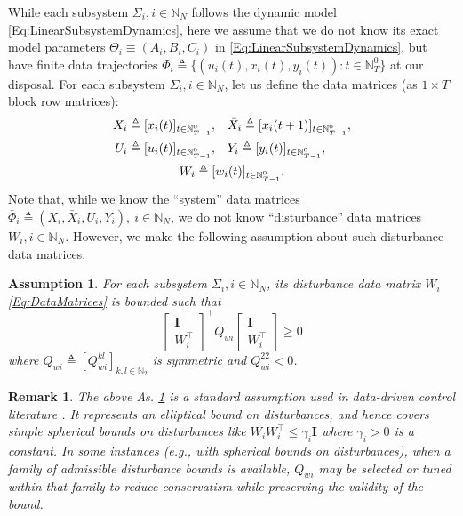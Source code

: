 \documentclass[letterpaper, 10 pt, conference]{ieeeconf}%
\newcommand{\N}{\mathbb{N}}
\newcommand{\T}{\top}
\newcommand{\I}{\mathbf{I}}
\newcommand{\0}{\mathbf{0}}
\newcommand{\bm}[1]{\begin{bmatrix}#1\end{bmatrix}}
\newtheorem{assumption}{\textbf{Assumption}}
\newtheorem{remark}{\textbf{Remark}}
\begin{document}
While each subsystem $\Sigma_i, i\in\N_N$ follows the dynamic model \eqref{Eq:LinearSubsystemDynamics}, here we assume that we do not know its exact model parameters $\Theta_i \equiv (A_i, B_i, C_i)$ in \eqref{Eq:LinearSubsystemDynamics}, but have finite data trajectories $\Phi_i \triangleq \{(u_i(t),x_i(t),y_i(t)): t\in\N_T^0\}$ at our disposal. For each subsystem $\Sigma_i, i\in\N_N$, let us define the data matrices (as $1 \times T$ block row matrices):
\begin{equation}\label{Eq:DataMatrices}
\begin{aligned}
X_i \triangleq [x_i(t)]_{t\in\N_{T-1}^0},& \quad  
\bar{X}_i \triangleq [x_i(t+1)]_{t\in\N_{T-1}^0},\\ 
U_i \triangleq [u_i(t)]_{t\in\N_{T-1}^0},& \quad
Y_i \triangleq [y_i(t)]_{t\in\N_{T-1}^0},\\ 
\span W_i \triangleq [w_i(t)]_{t\in\N_{T-1}^0}.
\end{aligned}
\end{equation}
Note that, while we know the ``system'' data matrices $\bar{\Phi}_i \triangleq  (X_i, \bar{X}_i, U_i, Y_i),\ i\in\N_N$, we do not know ``disturbance'' data matrices $W_i, i\in\N_N$. However, we make the following assumption about such disturbance data matrices. 

\begin{assumption}\label{As:DisturbanceData}
For each subsystem $\Sigma_i, i\in\N_N$, its disturbance data matrix $W_i$ \eqref{Eq:DataMatrices} is bounded such that
\begin{equation}\label{Eq:As:DisturbanceData}
\bm{\I \\ W_i^\T}^\T Q_{wi} \bm{\I  \\ W_i^\T} \geq 0
\end{equation} 
where $Q_{wi} \triangleq [Q_{wi}^{kl}]_{k,l\in\N_2}$ is symmetric and $Q_{wi}^{22}<0$.
\end{assumption}

\begin{remark}
The above As. \ref{As:DisturbanceData} is a standard assumption used in data-driven control literature \cite{Waarde2022}. It represents an elliptical bound on disturbances, and hence covers simple spherical bounds on disturbances like $W_i W_i^\T \leq \gamma_i \I$ where $\gamma_{i} > 0$ is a constant. 
In some instances (e.g., with spherical bounds on disturbances), when a family of admissible disturbance bounds is available, \(Q_{wi}\) may be selected or tuned within that family to reduce conservatism while preserving the validity of the bound. 
\end{remark}
 
\end{document}
